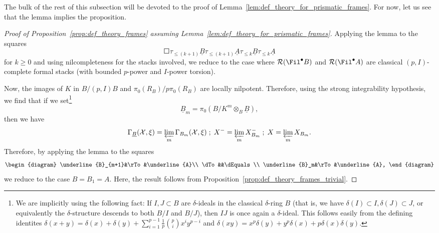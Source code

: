\documentclass[10pt]{amsart}
\begin{document}
The bulk of the rest of this subsection will be devoted to the proof of Lemma~\ref{lem:def_theory_for_prismatic_frames}. For now, let us see that the lemma implies the proposition.
\begin{proof}
[Proof of Proposition~\ref{prop:def_theory_frames} assuming Lemma~\ref{lem:def_theory_for_prismatic_frames}]
Applying the lemma to the squares
\[
\Square{\tau_{\leq (k+1)}\underline{B}}{}{\tau_{\leq (k+1)}\underline{A}}{}{}{\tau_{\leq k}\underline{B}}{}{\tau_{\leq k}\underline{A}}
\]
for $k\ge 0$ and using nilcompleteness for the stacks involved, we reduce to the case where $\mathcal{R}(\Fil^\bullet B)$ and $\mathcal{R}(\Fil^\bullet A)$ are classical $(p,I)$-complete formal stacks (with bounded $p$-power and $I$-power torsion).

Now, the images of $K$ in $B/(p,I)B$ and $\pi_0(R_B)/p\pi_0(R_B)$ are locally nilpotent. Therefore, using the strong integrability hypothesis, we find that if we set\footnote{We are implicitly using the following fact: If $I,J\subset B$ are $\delta$-ideals in the classical $\delta$-ring $B$ (that is, we have $\delta(I)\subset I,\delta(J)\subset J$, or equivalently the $\delta$-structure descends to both $B/I$ and $B/J$), then $IJ$ is once again a $\delta$-ideal. This follows easily from the defining identites $\delta(x+y) = \delta(x)+\delta(y) + \sum_{i=1}^{p-1}\frac{1}{p}\binom{p}{i}x^iy^{p-i}$ and $\delta(xy) = x^p\delta(y)+y^p\delta(x)+p\delta(x)\delta(y)$.}
\[
\underline{B}_m = \pi_0(B/K^m\otimes_B\underline{B}),
\]
then we have
\begin{align*}
\Gamma_{\underline{B}}(\mathcal{X},\xi) = \varprojlim_{m}\Gamma_{B_m}(\mathcal{X},\xi)\;;\;X^- = \varprojlim_m X^-_{B_m}\;;\; X = \varprojlim_m X_{B_m}.
\end{align*}
Therefore, by applying the lemma to the squares
\[
\begin{diagram}
\underline{B}_{m+1}&\rTo&\underline{A}\\
\dTo&&\dEquals\\
\underline{B}_m&\rTo&\underline{A},
\end{diagram}
\]
we reduce to the case $B=B_1=A$. Here, the result follows from Proposition~\ref{prop:def_theory_frames_trivial}.
\end{proof}
\end{document}
